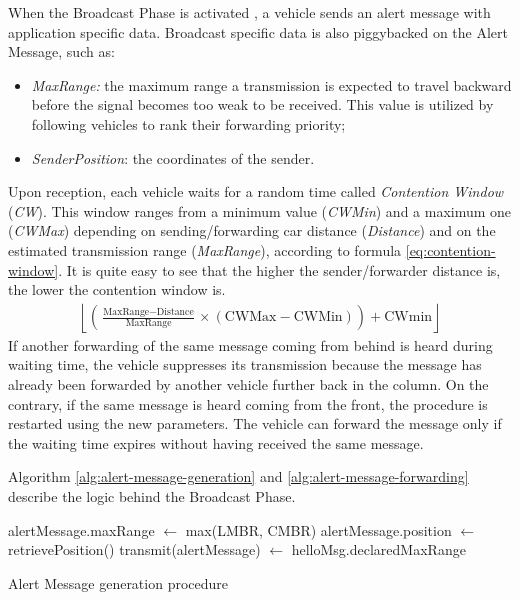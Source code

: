 		
		When the Broadcast Phase is activated , a vehicle sends an alert message with application specific data. Broadcast specific data is also piggybacked on the Alert Message, such as:
		\begin{itemize}
			\item \textit{MaxRange:} the maximum range a transmission is expected to travel backward before the signal becomes too weak to be received. This value is utilized by following vehicles to rank their forwarding priority;
			\item \textit{SenderPosition}: the coordinates of the sender.
		\end{itemize}
		Upon reception, each vehicle waits for a random time called \textit{Contention Window} (\textit{CW}). This window ranges from a minimum value (\textit{CWMin}) and a maximum one (\textit{CWMax}) depending on sending/forwarding car distance (\textit{Distance}) and on the estimated transmission range (\textit{MaxRange}), according to formula \ref{eq:contention-window}. It is quite easy to see that the higher the sender/forwarder distance is, the lower the contention window is.
		\begin{gather}
			\left\lfloor \left( \frac{\text{MaxRange} - \text{Distance}}{\text{MaxRange}} \times (\text{CWMax} - \text{CWMin}) \right) + \text{CWmin}  \right\rfloor
			\label{eq:contention-window}
		\end{gather}
		If another forwarding of the same message coming from behind is heard during waiting time, the vehicle suppresses its transmission because the message has already been forwarded by another vehicle further back in the column. On the contrary, if the same message is heard coming from the front, the procedure is restarted using the new parameters. The vehicle can forward the message only if the waiting time expires without having received the same message.
		
		Algorithm \ref{alg:alert-message-generation} and \ref{alg:alert-message-forwarding} describe the logic behind the Broadcast Phase.
		
		\begin{algorithm}[H]
			\begin{algorithmic}[1]
				\State alertMessage.maxRange $\gets$ max(LMBR, CMBR)
				\State alertMessage.position $\gets$ retrievePosition()
				\State transmit(alertMessage) $\gets$ helloMsg.declaredMaxRange
			\end{algorithmic}
			\caption{Alert Message generation procedure}
			\label{alg:alert-message-generation}
		\end{algorithm}
	
